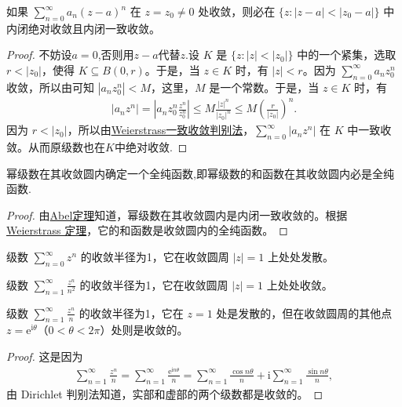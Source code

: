 \documentclass[../../main.tex]{subfiles}%
\begin{document}
\begin{theorem}[Abel定理]\label{theorem:Abel定理-定理4.2.3}
如果 \( \sum_{n=0}^{\infty} a_n (z-a)^n \) 在 \( z = z_0 \neq 0 \) 处收敛，则必在 \( \{z : |z-a| < |z_0-a|\} \) 中内闭绝对收敛且内闭一致收敛。
\end{theorem}
\begin{proof}
不妨设$a=0$,否则用$z-a$代替$z$.设 \( K \) 是 \( \{z : |z| < |z_0|\} \) 中的一个紧集，选取 \( r < |z_0| \)，使得 \( K \subseteq B(0, r) \)。于是，当 \( z \in K \) 时，有 \( |z| < r \)。因为 \( \sum_{n=0}^{\infty} a_n z_0^n \) 收敛，所以由可知 \( |a_n z_0^n| < M \)，这里，\( M \) 是一个常数。于是，当 \( z \in K \) 时，有
\begin{align*}
|a_n z^n| = \left| a_n z_0^n \frac{z^n}{z_0^n} \right| \leqslant M \frac{|z|^n}{|z_0|^n} \leqslant M \left( \frac{r}{|z_0|} \right)^n.
\end{align*}
因为 \( r < |z_0| \)，所以由\hyperref[theorem:Weierstrass一致收敛判别法]{Weierstrass一致收敛判别法}，\( \sum_{n=0}^{\infty} |a_n z^n| \) 在 \( K \) 中一致收敛。从而原级数也在$K$中绝对收敛.
\end{proof}

\begin{theorem}\label{theorem:定理4.2.4}
幂级数在其收敛圆内确定一个全纯函数,即幂级数的和函数在其收敛圆内必是全纯函数.
\end{theorem}
\begin{proof}
由\hyperref[theorem:Abel定理-定理4.2.3]{Abel定理}知道，幂级数在其收敛圆内是内闭一致收敛的。根据 \hyperref[theorem:Weierstrass定理]{Weierstrass 定理}，它的和函数是收敛圆内的全纯函数。
\end{proof}

\begin{example}
级数 \( \sum_{n=0}^{\infty} z^n \) 的收敛半径为1，它在收敛圆周 \( |z| = 1 \) 上处处发散。
\end{example}

\begin{example}
级数 \( \sum_{n=1}^{\infty} \frac{z^n}{n^2} \) 的收敛半径为1，它在收敛圆周 \( |z| = 1 \) 上处处收敛。
\end{example}

\begin{example}
级数 \( \sum_{n=1}^{\infty} \frac{z^n}{n} \) 的收敛半径为1，它在 \( z = 1 \) 处是发散的，但在收敛圆周的其他点 \( z = \mathrm{e}^{\mathrm{i}\theta} \)（\( 0 < \theta < 2\pi \)）处则是收敛的。
\end{example}
\begin{proof}
这是因为
\begin{align*}
\sum_{n=1}^{\infty} \frac{z^n}{n} = \sum_{n=1}^{\infty} \frac{\mathrm{e}^{\mathrm{i}n\theta}}{n} = \sum_{n=1}^{\infty} \frac{\cos n\theta}{n} + \mathrm{i}\sum_{n=1}^{\infty} \frac{\sin n\theta}{n},
\end{align*}
由 Dirichlet 判别法知道，实部和虚部的两个级数都是收敛的。
\end{proof}
\end{document}
